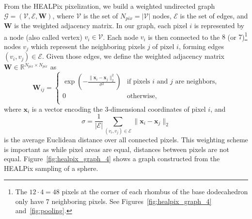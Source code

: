 \documentclass[final,twocolumn,3p,times,authoryear]{elsarticle}
\newcommand{\figref}[1]{Figure~\ref{fig:#1}}
\renewcommand{\b}[1]{{\bm{#1}}}   %
\newcommand{\1}{\b{1}}              %
\newcommand{\0}{\b{0}}              %
\newcommand{\G}{\mathcal{G}}
\newcommand{\V}{\mathcal{V}}
\newcommand{\E}{\mathcal{E}}
\newcommand{\W}{\b{W}}
\newcommand{\x}{\b{x}}
\newcommand{\R}{\mathbb{R}}
\begin{document}
From the HEALPix pixelization, we build a weighted undirected graph $\G = (\V, \E, \W)$, where $\V$ is the set of $N_{pix} = |\V|$ nodes, $\E$ is the set of edges, and $\W$ is the weighted adjacency matrix. In our graph, each pixel $i$ is represented by a node (also called vertex) $v_i \in \V$. Each node $v_i$ is then connected to the $8$ (or $7$)\footnote{\label{neighbors}The $12 \cdot 4 = 48$ pixels at the corner of each rhombus of the base dodecahedron only have 7 neighboring pixels. See Figures~\ref{fig:healpix_graph_4} and~\ref{fig:pooling}.} nodes $v_j$ which represent the neighboring pixels $j$ of pixel $i$, forming edges $(v_i, v_j) \in \E$. Given those edges, we define the weighted adjacency matrix $\W \in \R^{N_{pix} \times N_{pix}}$ as
\begin{equation*}
	\W_{ij} = \begin{cases}
		\exp \left( -\frac{\|\x_i-\x_j\|_2^2}{\sigma^2} \right) & \text{if pixels $i$ and $j$ are neighbors,} \\
		0 & \text{otherwise,} \\
	\end{cases}
\end{equation*}
where $\x_i$ is a vector encoding the 3-dimensional coordinates of pixel $i$, and
\begin{equation*}
	\sigma = \frac{1}{|\E|} \sum_{(v_i, v_j) \in \E} \|\x_i-\x_j\|_2
\end{equation*}
is the average Euclidean distance over all connected pixels. This weighting scheme is important as while pixel areas are equal, distances between pixels are not equal. \figref{healpix_graph_4} shows a graph constructed from the HEALPix sampling of a sphere.

\end{document}
